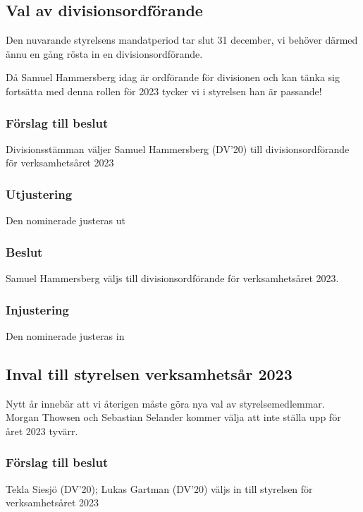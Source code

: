 \documentclass[protokoll]{dvd}
\begin{document}
\subsection{Val av divisionsordförande}
Den nuvarande styrelsens mandatperiod tar slut 31 december, vi behöver därmed ännu en gång rösta in
en divisionsordförande.

Då Samuel Hammersberg idag är ordförande för divisionen och kan tänka sig fortsätta med denna rollen
för 2023 tycker vi i styrelsen han är passande!

\subsubsection*{Förslag till beslut}
    \begin{attsatser}
    \item Divisionsstämman väljer Samuel Hammersberg (DV'20) till divisionsordförande för verksamhetsåret 2023
    \end{attsatser}

        \subsubsection*{Utjustering}
        Den nominerade justeras ut

        \subsubsection*{Beslut}
            \begin{attsatser}
                \item Samuel Hammersberg väljs till divisionsordförande för verksamhetsåret 2023.
            \end{attsatser}

        \subsubsection*{Injustering}
        Den nominerade justeras in

\newpage

\subsection{Inval till styrelsen verksamhetsår 2023}
Nytt år innebär att vi återigen måste göra nya val av styrelsemedlemmar.
Morgan Thowsen och Sebastian Selander kommer välja att inte ställa upp för året 2023 tyvärr.

    \subsubsection*{Förslag till beslut}
        \begin{attsatser}
            \item Tekla Siesjö (DV'20); Lukas Gartman (DV'20) väljs in till styrelsen för verksamhetsåret 2023
        \end{attsatser}
\end{document}
